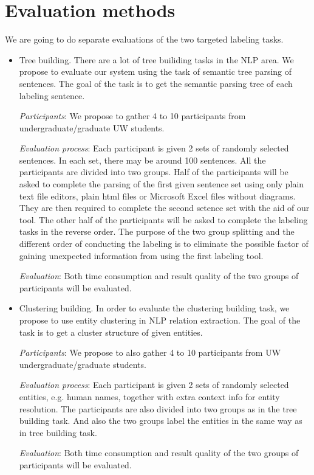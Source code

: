 \section{Evaluation methods}

We are going to do separate evaluations of the two targeted 
labeling tasks. 

\begin{itemize}

\item Tree building. There are a lot of tree builiding tasks in the
NLP area. We propose to evaluate our system using the task of semantic
tree parsing of sentences. The goal of the task is to get the semantic
parsing tree of each labeling sentence. 

\textit{Participants}: We propose to gather 4 to 10 participants from
undergraduate/graduate UW students.  

\textit{Evaluation process}: Each participant is given 2 sets of
randomly selected sentences.  In each set, there may be around 100
sentences. All the participants are divided into two groups.  Half of
the participants will be asked to complete the parsing of the first
given sentence set using only plain text file editors, plain html
files or Microsoft Excel files without diagrams. They are then
required to complete the second setence set with the aid of our tool.
The other half of the participants will be asked to complete the
labeling tasks in the reverse order. The purpose of the two group
splitting and the different order of conducting the labeling is to
eliminate the possible factor of gaining unexpected information from
using the first labeling tool.

\textit{Evaluation}: Both time consumption and result quality of the two
groups of participants will be evaluated.

\item Clustering building. In order to evaluate the clustering
building task, we propose to use entity clustering in NLP relation
extraction. The goal of the task is to get a cluster structure of
given entities.

\textit{Participants}: We propose to also gather 4 to 10 participants from
UW undergraduate/graduate students.

\textit{Evaluation process}: Each participant is given 2 sets of
randomly selected entities, e.g. human names, together with extra
context info for entity resolution. The participants are also divided
into two groups as in the tree building task. And also the two groups label the
entities in the same way as in tree building task.

\textit{Evaluation}: Both time consumption and result quality of the
two groups of participants will be evaluated.


\end{itemize}


